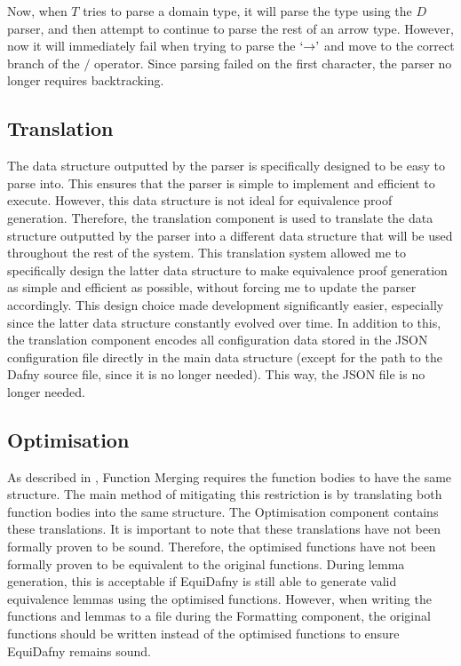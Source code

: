 Now, when \(T\) tries to parse a domain type, it will parse the type using the \(D\) parser, and then attempt to continue to parse the rest of an arrow type. However, now it will immediately fail when trying to parse the \(`{\rightarrow}\textrm'\) and move to the correct branch of the \(/\) operator. Since parsing failed on the first character, the parser no longer requires backtracking.  

\subsection{Translation}

The data structure outputted by the parser is specifically designed to be easy to parse into. This ensures that the parser is simple to implement and efficient to execute. However, this data structure is not ideal for equivalence proof generation. Therefore, the translation component is used to translate the data structure outputted by the parser into a different data structure that will be used throughout the rest of the system. This translation system allowed me to specifically design the latter data structure to make equivalence proof generation as simple and efficient as possible, without forcing me to update the parser accordingly. This design choice made development significantly easier, especially since the latter data structure constantly evolved over time. In addition to this, the translation component encodes all configuration data stored in the JSON configuration file directly in the main data structure (except for the path to the Dafny source file, since it is no longer needed). This way, the JSON file is no longer needed. 

\subsection{Optimisation}

As described in , Function Merging requires the function bodies to have the same structure. The main method of mitigating this restriction is by translating both function bodies into the same structure. The Optimisation component contains these translations. It is important to note that these translations have not been formally proven to be sound. Therefore, the optimised functions have not been formally proven to be equivalent to the original functions. During lemma generation, this is acceptable if EquiDafny is still able to generate valid equivalence lemmas using the optimised functions. However, when writing the functions and lemmas to a file during the Formatting component, the original functions should be written instead of the optimised functions to ensure EquiDafny remains sound. 

